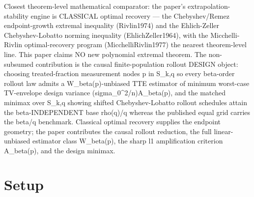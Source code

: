 \documentclass{article}
\begin{document}
Closest theorem-level mathematical comparator: the paper's extrapolation-stability engine is CLASSICAL optimal recovery — the Chebyshev/Remez endpoint-growth extremal inequality (Rivlin1974) and the Ehlich-Zeller Chebyshev-Lobatto norming inequality (EhlichZeller1964), with the Micchelli-Rivlin optimal-recovery program (MicchelliRivlin1977) the nearest theorem-level line. This paper claims NO new polynomial extremal theorem. The non-subsumed contribution is the causal finite-population rollout DESIGN object: choosing treated-fraction measurement nodes p in S_{k,q} so every beta-order rollout law admits a W_beta(p)-unbiased TTE estimator of minimum worst-case TV-envelope design variance (sigma_0^2/n)A_beta(p), and the matched minimax over S_{k,q} showing shifted Chebyshev-Lobatto rollout schedules attain the beta-INDEPENDENT base rho(q)/q whereas the published equal grid carries the beta/q benchmark. Classical optimal recovery supplies the endpoint geometry; the paper contributes the causal rollout reduction, the full linear-unbiased estimator class W_beta(p), the sharp l1 amplification criterion A_beta(p), and the design minimax.

\section{Setup}
\end{document}
